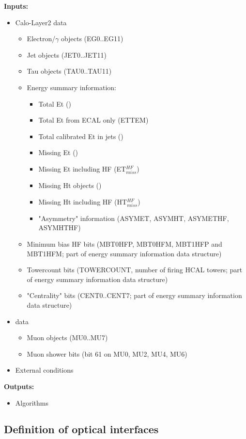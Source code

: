 \textbf{Inputs:}
\begin{itemize}
\item Calo-Layer2 data
\begin{itemize}
\item Electron/$\gamma$ objects (EG0..EG11)
\item Jet objects (JET0..JET11)
\item Tau objects (TAU0..TAU11)
\item Energy summary information:
\begin{itemize}
\item Total Et (\ett)
\item Total Et from ECAL only (ETTEM)
\item Total calibrated Et in jets (\htt)
\item Missing Et (\etm)
\item Missing Et including HF (ET$_{miss}^{HF}$)
\item Missing Ht objects (\htm)
\item Missing Ht including HF (HT$_{miss}^{HF}$)
\item "Asymmetry" information (ASYMET, ASYMHT, ASYMETHF, ASYMHTHF)
\end{itemize}
\item Minimum bias HF bits (MBT0HFP, MBT0HFM, MBT1HFP and MBT1HFM; part of energy summary information data structure)
\item Towercount bits (TOWERCOUNT, number of firing HCAL towers; part of energy summary information data structure)
\item "Centrality" bits (CENT0..CENT7; part of energy summary information data structure)
\end{itemize}
\item \gmt data
\begin{itemize}
\item Muon objects (MU0..MU7)
\item Muon shower bits (bit 61 on MU0, MU2, MU4, MU6)
\end{itemize}
\item External conditions
\end{itemize}
\textbf{Outputs:}
\begin{itemize}
\item Algorithms
\end{itemize}

\subsection{Definition of optical interfaces}
\label{sec:gtl:optical_interfaces}

